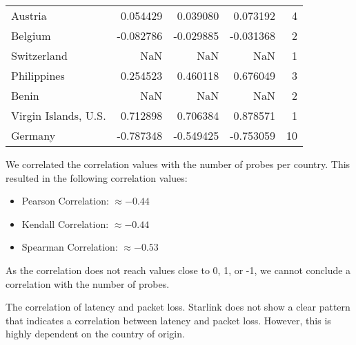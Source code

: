 \begin{table}[ht]
\begin{tabular}{lrrrr}
		Austria               & 0.054429    & 0.039080    & 0.073192    & 4         \\
		Belgium               & -0.082786   & -0.029885   & -0.031368   & 2         \\
		Switzerland           & NaN         & NaN         & NaN         & 1         \\
		Philippines           & 0.254523    & 0.460118    & 0.676049    & 3         \\
		Benin                 & NaN         & NaN         & NaN         & 2         \\
		Virgin Islands, U.S.  & 0.712898    & 0.706384    & 0.878571    & 1         \\
		Germany               & -0.787348   & -0.549425   & -0.753059   & 10        \\
		\bottomrule
	\end{tabular}
\end{table}

We correlated the correlation values with the number of probes per country. This resulted in the following correlation values:

\begin{itemize}
	\item Pearson Correlation: $\approx -0.44$
	\item Kendall Correlation: $\approx -0.44$
	\item Spearman Correlation: $\approx -0.53$
\end{itemize}

As the correlation does not reach values close to 0, 1, or -1, we cannot conclude a correlation with the number of probes.

\begin{takeaway}{The correlation of latency and packet loss.}
	Starlink does not show a clear pattern that indicates a correlation between latency and packet loss.
	However, this is highly dependent on the country of origin.
\end{takeaway}
